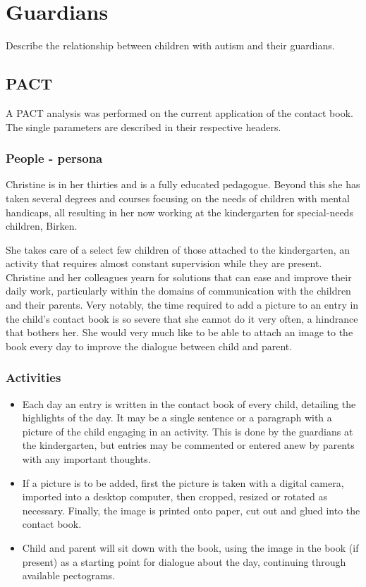\section{Guardians}
Describe the relationship between children with autism and their guardians.
\subsection{PACT}
A PACT analysis was performed on the current application of the contact book. The single parameters are described in their respective headers.
\subsubsection*{People - persona}
Christine is in her thirties and is a fully educated pedagogue. Beyond this she has taken several degrees and courses focusing on the needs of children with mental handicaps, all resulting in her now working at the kindergarten for special-needs children, Birken.

She takes care of a select few children of those attached to the kindergarten, an activity that requires almost constant supervision while they are present. Christine and her colleagues yearn for solutions that can ease and improve their daily work, particularly within the domains of communication with the children and their parents. Very notably, the time required to add a picture to an entry in the child's contact book is so severe that she cannot do it very often, a hindrance that bothers her. She would very much like to be able to attach an image to the book every day to improve the dialogue between child and parent.
\subsubsection*{Activities}
\begin{itemize}
	\item Each day an entry is written in the contact book of every child, detailing the highlights of the day. It may be a single sentence or a paragraph with a picture of the child engaging in an activity. This is done by the guardians at the kindergarten, but entries may be commented or entered anew by parents with any important thoughts.
	\item If a picture is to be added, first the picture is taken with a digital camera, imported into a desktop computer, then cropped, resized or rotated as necessary. Finally, the image is printed onto paper, cut out and glued into the contact book.
	\item Child and parent will sit down with the book, using the image in the book (if present) as a starting point for dialogue about the day, continuing through available pectograms.
\end{itemize}
